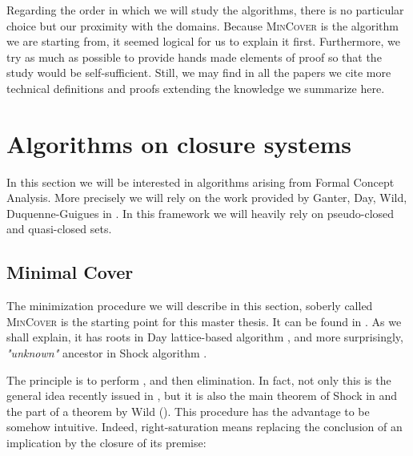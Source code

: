 \vspace{1.2em}

Regarding the order in which we will study the algorithms, there is no particular choice but our proximity with the domains. Because \textsc{MinCover} 
is the algorithm we are starting from, it seemed logical for us to explain
it first. Furthermore, we try as much as possible to provide hands made elements
of proof so that the study would be self-sufficient. Still, we may find in all
the papers we cite more technical definitions and proofs extending 
the knowledge we summarize here.





\section{Algorithms on closure systems}

In this section we will be interested in algorithms arising from Formal Concept
Analysis. More precisely we will rely on the work provided by Ganter, Day, Wild,
Duquenne-Guigues in \cite{ganter_formal_1999, ganter_two_2010, day_lattice_1992, wild_implicational_1989, wild_computations_1995, guigues_familles_1986, duquenne_variations_2007}. In this framework we will heavily rely on pseudo-closed and quasi-closed sets.



\subsection{Minimal Cover}

The minimization procedure we will describe in this section, soberly called
\textsc{MinCover} is the starting point for this master thesis. It can be found
in \cite{ganter_conceptual_2016}. As we shall explain, it has roots in
Day lattice-based algorithm \cite{day_lattice_1992}, and more surprisingly, 
\textit{"unknown"} ancestor in Shock algorithm \cite{shock_computing_1986}. 

\vspace{1.2em}

The principle is to perform , and then  elimination. In fact, not only this is the general idea recently 
issued in \cite{boros_strong_2017}, but it is also the main theorem of Shock in 
\cite{shock_computing_1986} and the part of a theorem by Wild 
(\cite{wild_implicational_1989, wild_theory_1994}). This procedure has the 
advantage to be somehow intuitive. Indeed, right-saturation means replacing the 
conclusion of an implication by the closure of its premise:

